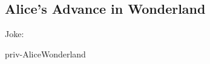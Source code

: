 
\subsection{Alice's Advance in Wonderland\cite{AliceWonderland}}

Joke: 

\ifdetail
{{priv-AliceWonderland} }
\fi

